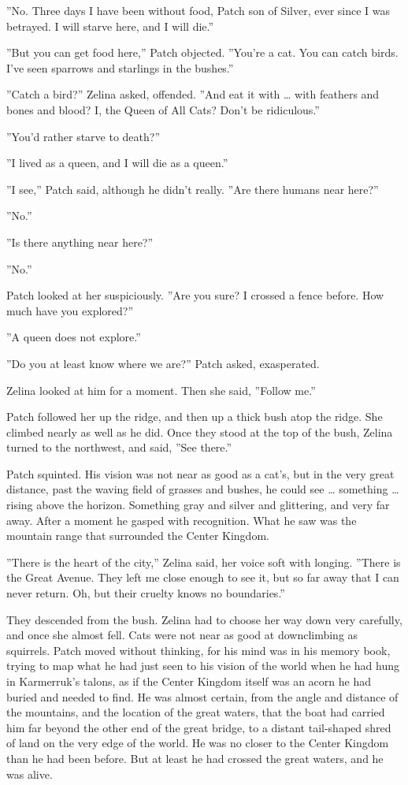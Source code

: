 \documentclass[12pt]{book}
\begin{document}
''No. Three days I have been without food, Patch son of Silver, ever since I was betrayed. I will starve here, and I will die.''

''But you can get food here,'' Patch objected. ''You're a cat. You can catch birds. I've seen sparrows and starlings in the bushes.''

''Catch a bird?'' Zelina asked, offended. ''And eat it with \ldots{}
with feathers and bones and blood? I, the Queen of All Cats? Don't be ridiculous.''

''You'd rather starve to death?''

''I lived as a queen, and I will die as a queen.''

''I see,'' Patch said, although he didn't really. ''Are there humans near here?''

''No.''

''Is there anything near here?''

''No.''

Patch looked at her suspiciously. ''Are you sure? I crossed a fence before. How much have you explored?''

''A queen does not explore.''

''Do you at least know where we are?'' Patch asked, exasperated.

Zelina looked at him for a moment. Then she said, ''Follow me.''

Patch followed her up the ridge, and then up a thick bush atop the ridge. She climbed nearly as well as he did. Once they stood at the top of the bush, Zelina turned to the northwest, and said, ''See there.''

Patch squinted. His vision was not near as good as a cat's, but in the very great distance, past the waving field of grasses and bushes, he could see \ldots{}
something \ldots{}
rising above the horizon. Something gray and silver and glittering, and very far away. After a moment he gasped with recognition. What he saw was the mountain range that surrounded the Center Kingdom.

''There is the heart of the city,'' Zelina said, her voice soft with longing. ''There is the Great Avenue. They left me close enough to see it, but so far away that I can never return. Oh, but their cruelty knows no boundaries.''

They descended from the bush. Zelina had to choose her way down very carefully, and once she almost fell. Cats were not near as good at downclimbing as squirrels. Patch moved without thinking, for his mind was in his memory book, trying to map what he had just seen to his vision of the world when he had hung in Karmerruk's talons, as if the Center Kingdom itself was an acorn he had buried and needed to find. He was almost certain, from the angle and distance of the mountains, and the location of the great waters, that the boat had carried him far beyond the other end of the great bridge, to a distant tail-shaped shred of land on the very edge of the world. He was no closer to the Center Kingdom than he had been before. But at least he had crossed the great waters, and he was alive.
\end{document}
